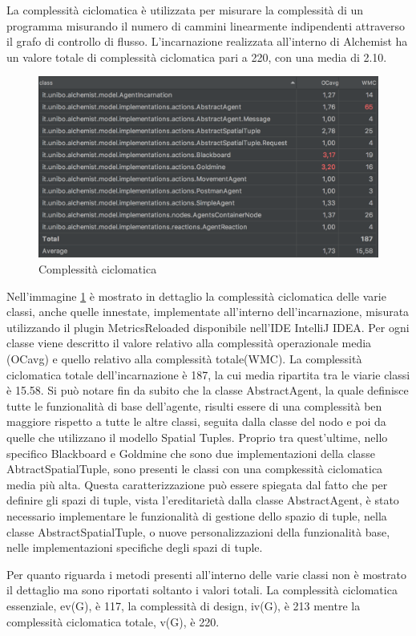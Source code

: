 La complessità ciclomatica è utilizzata per misurare la complessità di un programma misurando il numero di cammini linearmente indipendenti attraverso il grafo di controllo di flusso.
L'incarnazione realizzata all'interno di Alchemist ha un valore totale di complessità ciclomatica pari a 220, con una media di 2.10.
\begin{figure} %
\begin{center} %
\includegraphics[width=14cm]{images/complessitaCiclomatica.png} %
\caption[Complessità ciclomatica]{Complessità ciclomatica} \label{fig:cyclomaticComplexity}
\end{center}
\end{figure}

Nell'immagine \ref{fig:cyclomaticComplexity} è mostrato in dettaglio la complessità ciclomatica delle varie classi, anche quelle innestate, implementate all'interno dell'incarnazione, misurata utilizzando il plugin MetricsReloaded disponibile nell'IDE IntelliJ IDEA. Per ogni classe viene descritto il valore relativo alla complessità operazionale media (OCavg) e quello relativo alla complessità totale(WMC).
La complessità ciclomatica totale dell'incarnazione è 187, la cui media ripartita tra le viarie classi è 15.58.
Si può notare fin da subito che la classe AbstractAgent, la quale definisce tutte le funzionalità di base dell'agente, risulti essere di una complessità ben maggiore rispetto a tutte le altre classi, seguita dalla classe del nodo e poi da quelle che utilizzano il modello Spatial Tuples.
Proprio tra quest'ultime, nello specifico Blackboard e Goldmine che sono due implementazioni della classe AbtractSpatialTuple, sono presenti le classi con una compkessità ciclomatica media più alta. Questa caratterizzazione può essere spiegata dal fatto che per definire gli spazi di tuple, vista l'ereditarietà dalla classe AbstractAgent, è stato necessario implementare le funzionalità di gestione dello spazio di tuple, nella classe AbstractSpatialTuple, o nuove personalizzazioni della funzionalità base, nelle implementazioni specifiche degli spazi di tuple.

Per quanto riguarda i metodi presenti all'interno delle varie classi non è mostrato il dettaglio ma sono riportati soltanto i valori totali.
La complessità ciclomatica essenziale, ev(G), è 117, la complessità di design, iv(G), è 213 mentre la complessità ciclomatica totale, v(G), è 220.
